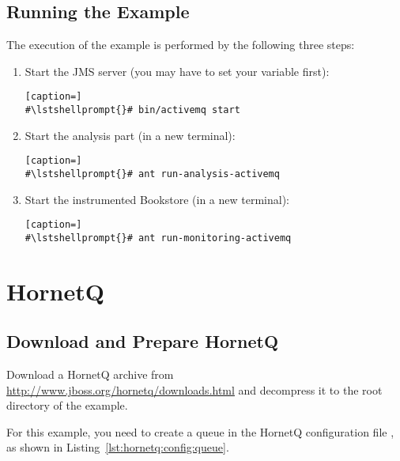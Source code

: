 \setPropertiesListing


\subsection{Running the Example}

 The execution of the example is performed by the following three steps:
\begin{enumerate}
\item Start the JMS server (you may have to set your  variable first):

\setBashListing
\begin{lstlisting}[caption=]
#\lstshellprompt{}# bin/activemq start
\end{lstlisting}
\item Start the analysis part (in a new terminal):
\setBashListing
\begin{lstlisting}[caption=]
#\lstshellprompt{}# ant run-analysis-activemq
\end{lstlisting}
\item Start the instrumented Bookstore (in a new terminal):
\setBashListing
\begin{lstlisting}[caption=]
#\lstshellprompt{}# ant run-monitoring-activemq
\end{lstlisting}
\end{enumerate}


\section{HornetQ}\label{example:jms:hornetq}

\subsection{Download and Prepare HornetQ}

Download a HornetQ archive from \url{http://www.jboss.org/hornetq/downloads.html} %
and decompress it to the root directory of the example. 

For this example, you need to create a queue in the HornetQ configuration file %
, as shown in Listing~\ref{lst:hornetq:config:queue}.

